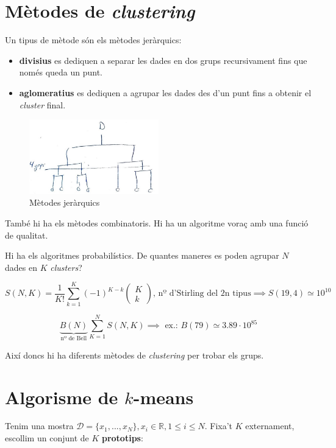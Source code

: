 \documentclass[a4paper]{article}
\begin{document}
\section{Mètodes de \emph{clustering}}

Un tipus de mètode són els mètodes jeràrquics:
\begin{itemize}
	\item \textbf{divisius} es dediquen a separar les dades en dos grups recursivament fins que només queda un punt.
	\item \textbf{aglomeratius} es dediquen a agrupar les dades des d'un punt fins a obtenir el \emph{cluster} final.
\end{itemize}

\begin{figure}[H]
    \centering
    \includegraphics[width=0.5\textwidth]{figura_3}
    \caption{Mètodes jeràrquics}
\end{figure}

També hi ha els mètodes combinatoris. Hi ha un algoritme voraç amb una funció de qualitat.

Hi ha els algoritmes probabilístics. De quantes maneres es poden agrupar $N$ dades en $K$ \emph{clusters}?

$$ S(N, K) = \frac{1}{K!} \sum_{k=1}^K (-1)^{K-k} \begin{pmatrix}
K \\ k
\end{pmatrix} \text{, nº d'Stirling del 2n tipus} \implies S(19,4) \simeq 10^{10} $$

$$ \underbrace{B(N)}_{\text{nº de Bell}} \sum_{K=1}^{N} S(N,K) \implies \text{ ex.: } B(79) \simeq 3.89·10^85 $$

Així doncs hi ha diferents mètodes de \emph{clustering} per trobar els grups.

\section{Algorisme de $k$-means}

Tenim una mostra $\mathcal{D} = \{ x_1,..., x_N \} , x_i \in \mathbb{R}, 1 \le i \le N$. Fixa't $K$ externament, escollim un conjunt de $K$ \textbf{prototips}:
\end{document}
